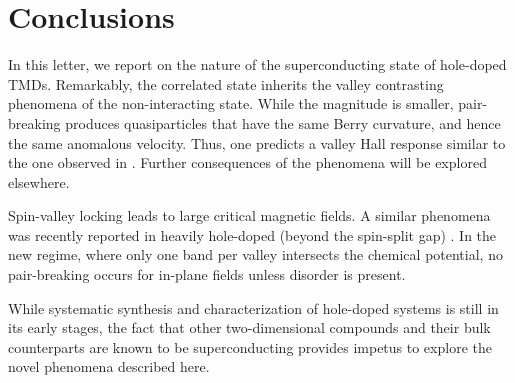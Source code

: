 \section{Conclusions}

In this letter, we report on the nature of the superconducting state
of hole-doped TMDs.
Remarkably, the correlated state inherits
the valley contrasting phenomena of the non-interacting state.
While the magnitude is smaller, pair-breaking produces quasiparticles
that have the same Berry curvature, and hence the same anomalous velocity.
Thus, one predicts a valley Hall response similar to
the one observed in .
Further consequences of the phenomena will be explored elsewhere.

Spin-valley locking leads to large critical magnetic fields.
A similar phenomena was recently reported in heavily hole-doped
(beyond the spin-split gap) 
\cite{%
  1510.06289v2,%
  PhysRevLett.113.097001%
}.
In the new regime, where only one band per valley intersects
the chemical potential, no pair-breaking occurs
for in-plane fields unless disorder is present.

While systematic synthesis and characterization of hole-doped systems
is still in its early stages, the fact that other two-dimensional compounds
and their bulk counterparts are known to be superconducting
\cite{%
  PhysRevB.88.054515%
}
provides impetus to explore the novel phenomena described here.
